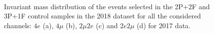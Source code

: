 \begin{figure}[!htb]
\begin{center}
         \\       
\caption{
Invariant mass distribution of the events selected in the 2P+2F and 3P+1F control samples in the
2018 dataset for all the considered channels: $4e$ (a), $4\mu$ (b), $2\mu2e$ (c) and $2e2\mu$ (d) for 2017 data.
}
\label{fig:combOS_dataMC2017}
\end{center}
\end{figure}

